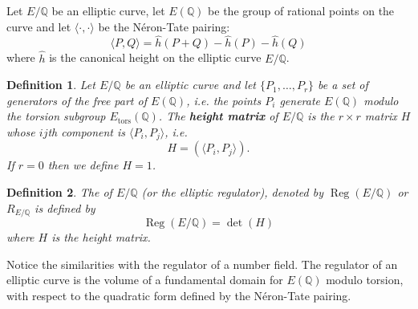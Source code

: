 \documentclass[12pt]{article}
\newtheorem{defn}{Definition}
\theoremstyle{definition}
\newcommand{\Rats}{\mathbb{Q}}
\begin{document}
Let $E/\Rats$ be an elliptic curve, let $E(\Rats)$ be the group of rational points on the curve and let $\langle \cdot, \cdot \rangle$ be the N\'eron-Tate pairing:
$$\langle P,Q \rangle=\hat{h}(P+Q)-\hat{h}(P)-\hat{h}(Q)$$
where $\hat{h}$ is the canonical height on the elliptic curve $E/\Rats$.

\begin{defn}
Let $E/\Rats$ be an elliptic curve and let $\{P_1,\ldots,P_r\}$ be a set of generators of the free part of $E(\Rats)$, i.e. the points $P_i$ generate $E(\Rats)$ modulo the torsion subgroup $E_{\operatorname{tors}}(\Rats)$. The {\bf height matrix} of $E/\Rats$ is the $r\times r$ matrix $H$ whose $ij$th component is $\langle P_i, P_j \rangle$, i.e.
$$H = (\langle P_i, P_j \rangle).$$
If $r=0$ then we define $H=1$.
\end{defn}

\begin{defn}
The {\bf {}} of $E/\Rats$ (or the elliptic regulator), denoted by $\operatorname{Reg}(E/\Rats)$ or $R_{E/\Rats}$ is defined by
$$\operatorname{Reg}(E/\Rats)=\det(H)$$
where $H$ is the height matrix.
\end{defn}

Notice the similarities with the regulator of a number field. The regulator of an elliptic curve is the volume of a fundamental domain for $E(\Rats)$ modulo torsion, with respect to the quadratic form defined by the N\'eron-Tate pairing.
\end{document}
